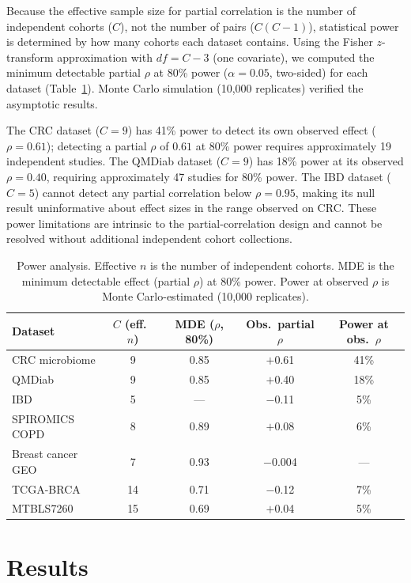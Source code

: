\documentclass[11pt]{article}
\begin{document}
Because the effective sample size for partial correlation is the number of independent cohorts ($C$), not the number of pairs ($C(C-1)$), statistical power is determined by how many cohorts each dataset contains. Using the Fisher $z$-transform approximation with $df = C - 3$ (one covariate), we computed the minimum detectable partial $\rho$ at 80\% power ($\alpha = 0.05$, two-sided) for each dataset (Table~\ref{tab:power}). Monte Carlo simulation (10{,}000 replicates) verified the asymptotic results.

The CRC dataset ($C = 9$) has 41\% power to detect its own observed effect ($\rho = 0.61$); detecting a partial $\rho$ of $0.61$ at 80\% power requires approximately 19 independent studies. The QMDiab dataset ($C = 9$) has 18\% power at its observed $\rho = 0.40$, requiring approximately 47 studies for 80\% power. The IBD dataset ($C = 5$) cannot detect any partial correlation below $\rho = 0.95$, making its null result uninformative about effect sizes in the range observed on CRC. These power limitations are intrinsic to the partial-correlation design and cannot be resolved without additional independent cohort collections.

\begin{table}[t]
\centering
\caption{Power analysis. Effective $n$ is the number of independent cohorts. MDE is the minimum detectable effect (partial $\rho$) at 80\% power. Power at observed $\rho$ is Monte Carlo-estimated (10{,}000 replicates).}
\label{tab:power}
\begin{tabular}{lcccc}
\toprule
Dataset & $C$ (eff.\ $n$) & MDE ($\rho$, 80\%) & Obs.\ partial $\rho$ & Power at obs.\ $\rho$ \\
\midrule
CRC microbiome & 9 & 0.85 & $+$0.61 & 41\% \\
QMDiab & 9 & 0.85 & $+$0.40 & 18\% \\
IBD & 5 & --- & $-$0.11 & 5\% \\
SPIROMICS COPD & 8 & 0.89 & $+$0.08 & 6\% \\
Breast cancer GEO & 7 & 0.93 & $-$0.004 & --- \\
TCGA-BRCA & 14 & 0.71 & $-$0.12 & 7\% \\
MTBLS7260 & 15 & 0.69 & $+$0.04 & 5\% \\
\bottomrule
\end{tabular}
\end{table}


\section{Results}
\end{document}
